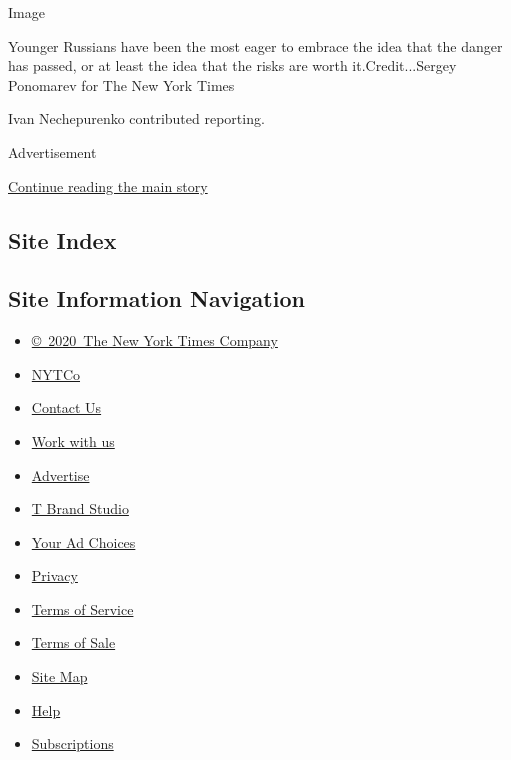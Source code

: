 Image

Younger Russians have been the most eager to embrace the idea that the
danger has passed, or at least the idea that the risks are worth
it.Credit...Sergey Ponomarev for The New York Times

Ivan Nechepurenko contributed reporting.

Advertisement

\protect\hyperlink{after-bottom}{Continue reading the main story}

\hypertarget{site-index}{%
\subsection{Site Index}\label{site-index}}

\hypertarget{site-information-navigation}{%
\subsection{Site Information
Navigation}\label{site-information-navigation}}

\begin{itemize}
\tightlist
\item
  \href{https://help.nytimes3xbfgragh.onion/hc/en-us/articles/115014792127-Copyright-notice}{©~2020~The
  New York Times Company}
\end{itemize}

\begin{itemize}
\tightlist
\item
  \href{https://www.nytco.com/}{NYTCo}
\item
  \href{https://help.nytimes3xbfgragh.onion/hc/en-us/articles/115015385887-Contact-Us}{Contact
  Us}
\item
  \href{https://www.nytco.com/careers/}{Work with us}
\item
  \href{https://nytmediakit.com/}{Advertise}
\item
  \href{http://www.tbrandstudio.com/}{T Brand Studio}
\item
  \href{https://www.nytimes3xbfgragh.onion/privacy/cookie-policy\#how-do-i-manage-trackers}{Your
  Ad Choices}
\item
  \href{https://www.nytimes3xbfgragh.onion/privacy}{Privacy}
\item
  \href{https://help.nytimes3xbfgragh.onion/hc/en-us/articles/115014893428-Terms-of-service}{Terms
  of Service}
\item
  \href{https://help.nytimes3xbfgragh.onion/hc/en-us/articles/115014893968-Terms-of-sale}{Terms
  of Sale}
\item
  \href{https://spiderbites.nytimes3xbfgragh.onion}{Site Map}
\item
  \href{https://help.nytimes3xbfgragh.onion/hc/en-us}{Help}
\item
  \href{https://www.nytimes3xbfgragh.onion/subscription?campaignId=37WXW}{Subscriptions}
\end{itemize}
